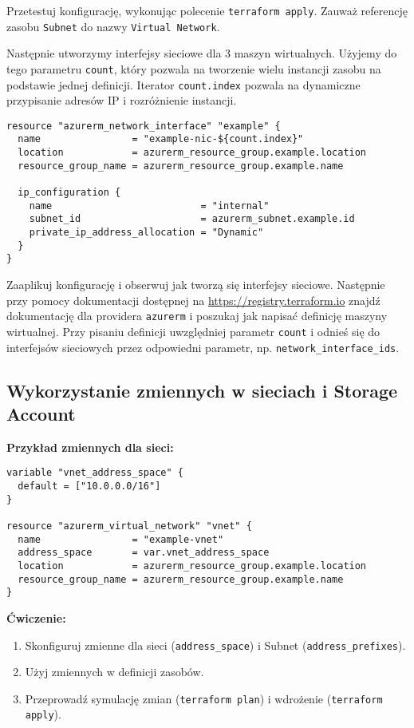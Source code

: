 \documentclass{article}
\begin{document}
Przetestuj konfigurację, wykonując polecenie \texttt{terraform apply}. Zauważ referencję zasobu \texttt{Subnet} do nazwy \texttt{Virtual Network}.

Następnie utworzymy interfejsy sieciowe dla 3 maszyn wirtualnych. Użyjemy do tego parametru \texttt{count}, który pozwala na tworzenie wielu instancji zasobu na podstawie jednej definicji. Iterator \texttt{count.index} pozwala na dynamiczne przypisanie adresów IP i rozróżnienie instancji.

\begin{lstlisting}
resource "azurerm_network_interface" "example" {
  name                = "example-nic-${count.index}"
  location            = azurerm_resource_group.example.location
  resource_group_name = azurerm_resource_group.example.name

  ip_configuration {
    name                          = "internal"
    subnet_id                     = azurerm_subnet.example.id
    private_ip_address_allocation = "Dynamic"
  }
}
\end{lstlisting}

Zaaplikuj konfigurację i obserwuj jak tworzą się interfejsy sieciowe. Następnie przy pomocy dokumentacji dostępnej na \url{https://registry.terraform.io} znajdź dokumentację dla providera \texttt{azurerm} i poszukaj jak napisać definicję maszyny wirtualnej. Przy pisaniu definicji uwzględniej parametr \texttt{count} i odnieś się do interfejsów sieciowych przez odpowiedni parametr, np. \texttt{network\_interface\_ids}.

\subsection{Wykorzystanie zmiennych w sieciach i Storage Account}
\textbf{Przykład zmiennych dla sieci:}
\begin{lstlisting}
variable "vnet_address_space" {
  default = ["10.0.0.0/16"]
}

resource "azurerm_virtual_network" "vnet" {
  name                = "example-vnet"
  address_space       = var.vnet_address_space
  location            = azurerm_resource_group.example.location
  resource_group_name = azurerm_resource_group.example.name
}
\end{lstlisting}

\textbf{Ćwiczenie:}
\begin{enumerate}
    \item Skonfiguruj zmienne dla sieci (\texttt{address\_space}) i Subnet (\texttt{address\_prefixes}).
    \item Użyj zmiennych w definicji zasobów.
    \item Przeprowadź symulację zmian (\texttt{terraform plan}) i wdrożenie (\texttt{terraform apply}).
\end{enumerate}
\end{document}
